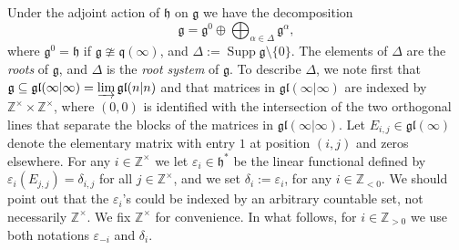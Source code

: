 \documentclass[12pt]{amsart}
\newcommand\Z{\mathbb{Z}}
\newcommand\g{\mathfrak{g}}
\newcommand\fq{\mathfrak{q}}
\newcommand\fh{\mathfrak{h}}
\newcommand\fgl{\mathfrak{gl}}
\newcommand\D{\Delta}
\DeclareMathOperator{\Supp}{Supp} %
\theoremstyle{plain}
\theoremstyle{definition}
\numberwithin{equation}{section}
\begin{document}
Under the adjoint action of $\fh$ on $\g$ we have the decomposition
	\[
\g = \g^0\oplus \bigoplus_{\alpha\in \D} \g^\alpha,
	\]
where $\g^0 = \fh$ if $\g\ncong \fq(\infty)$, and $\D := \Supp \g\setminus \{0\}$. The elements of $\D$ are the \emph{roots} of $\g$, and $\D$ is the \emph{root system} of $\g$.  To describe $\D$, we note first that $\g \subseteq \fgl(\infty | \infty) = \varinjlim \fgl(n|n)$ and that matrices in $\fgl(\infty | \infty)$ are indexed by $\Z^\times \times \Z^\times $, where $(0,0)$ is identified with the intersection of the two orthogonal lines that separate the blocks of the matrices in $\fgl(\infty | \infty)$. Let $E_{i,j}\in \fgl(\infty)$ denote the elementary matrix with entry $1$ at position $(i,j)$ and zeros elsewhere. For any $i\in \Z^\times $ we let $\varepsilon_i\in \fh^*$ be the linear functional defined by $\varepsilon_i(E_{j,j}) = \delta_{i, j}$ for all $j\in \Z^\times $, and we set $\delta_i:=\varepsilon_i$, for any $i\in \Z_{<0}$. We should point out that the $\varepsilon_i$'s could be indexed by an arbitrary countable set, not necessarily $\Z^\times $. We fix $\Z^\times$ for convenience.  In what follows, for $i\in \Z_{>0}$ we use both notations $\varepsilon_{-i}$ and $\delta_i$.
\end{document}
